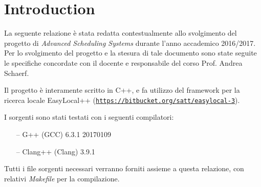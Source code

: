 
\section{Introduction} %
\label{sec:introduction}
    
    La seguente relazione è stata redatta contestualmente allo svolgimento del progetto di \emph{Advanced Scheduling Systems} durante l'anno accademico 2016/2017. Per lo svolgimento del progetto e la stesura di tale documento sono state seguite le specifiche concordate con il docente e responsabile del corso Prof. Andrea Schaerf.

    Il progetto è interamente scritto in C++, e fa utilizzo del framework per la ricerca locale EasyLocal++ (\href{https://bitbucket.org/satt/easylocal-3}{\texttt{https://bitbucket.org/satt/easylocal-3}}).

    I sorgenti sono stati testati con i seguenti compilatori:
    \begin{itemize}
        \item[--] G++ (GCC) 6.3.1 20170109
        \item[--] Clang++ (Clang) 3.9.1
    \end{itemize}

    Tutti i file sorgenti necessari verranno forniti assieme a questa relazione, con relativi \emph{Makefile} per la compilazione. 


